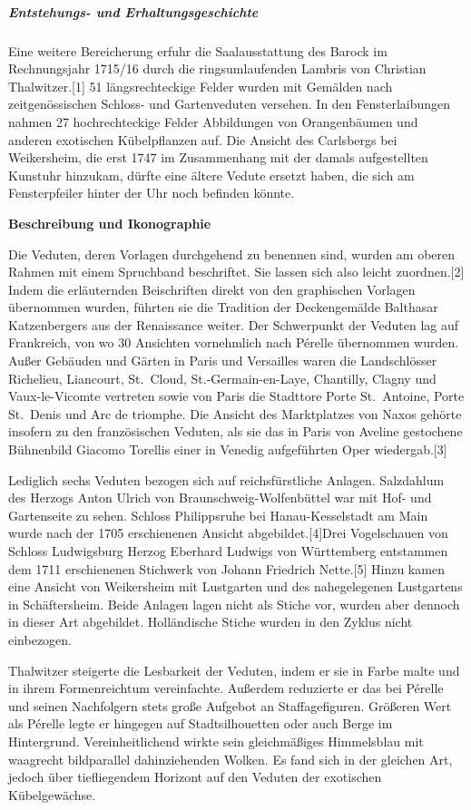\documentclass{book}
\begin{document}
\subparagraph{Entstehungs- und
Erhaltungsgeschichte}\label{entstehungs--und-erhaltungsgeschichte}

Eine weitere Bereicherung erfuhr die Saalausstattung des Barock im
Rechnungsjahr 1715/16 durch die ringsumlaufenden Lambris von Christian
Thalwitzer.{[}1{]} 51 längsrechteckige Felder wurden mit Gemälden nach
zeitgenössischen Schloss- und Gartenveduten versehen. In den
Fensterlaibungen nahmen 27 hochrechteckige Felder Abbildungen von
Orangenbäumen und anderen exotischen Kübelpflanzen auf. Die Ansicht des
Carlsbergs bei Weikersheim, die erst 1747 im Zusammenhang mit der damals
aufgestellten Kunstuhr hinzukam, dürfte eine ältere Vedute ersetzt
haben, die sich am Fensterpfeiler hinter der Uhr noch befinden könnte.

\textbf{Beschreibung und Ikonographie}

Die Veduten, deren Vorlagen durchgehend zu benennen sind, wurden am
oberen Rahmen mit einem Spruchband beschriftet. Sie lassen sich also
leicht zuordnen.{[}2{]} Indem die erläuternden Beischriften direkt von
den graphischen Vorlagen übernommen wurden, führten sie die Tradition
der Deckengemälde Balthasar Katzenbergers aus der Renaissance weiter.
Der Schwerpunkt der Veduten lag auf Frankreich, von wo 30 Ansichten
vornehmlich nach Pérelle übernommen wurden. Außer Gebäuden und Gärten in
Paris und Versailles waren die Landschlösser Richelieu, Liancourt,
St.~Cloud, St.-Germain-en-Laye, Chantilly, Clagny und Vaux-le-Vicomte
vertreten sowie von Paris die Stadttore Porte St.~Antoine, Porte
St.~Denis und Arc de triomphe. Die Ansicht des Marktplatzes von Naxos
gehörte insofern zu den französischen Veduten, als sie das in Paris von
Aveline gestochene Bühnenbild Giacomo Torellis einer in Venedig
aufgeführten Oper wiedergab.{[}3{]}

Lediglich sechs Veduten bezogen sich auf reichsfürstliche Anlagen.
Salzdahlum des Herzogs Anton Ulrich von Braunschweig-Wolfenbüttel war
mit Hof- und Gartenseite zu sehen. Schloss Philippsruhe bei
Hanau-Kesselstadt am Main wurde nach der 1705 erschienenen Ansicht
abgebildet.{[}4{]}Drei Vogelschauen von Schloss Ludwigsburg Herzog
Eberhard Ludwigs von Württemberg entstammen dem 1711 erschienenen
Stichwerk von Johann Friedrich Nette.{[}5{]} Hinzu kamen eine Ansicht
von Weikersheim mit Lustgarten und des nahegelegenen Lustgartens in
Schäftersheim. Beide Anlagen lagen nicht als Stiche vor, wurden aber
dennoch in dieser Art abgebildet. Holländische Stiche wurden in den
Zyklus nicht einbezogen.

Thalwitzer steigerte die Lesbarkeit der Veduten, indem er sie in Farbe
malte und in ihrem Formenreichtum vereinfachte. Außerdem reduzierte er
das bei Pérelle und seinen Nachfolgern stets große Aufgebot an
Staffagefiguren. Größeren Wert als Pérelle legte er hingegen auf
Stadtsilhouetten oder auch Berge im Hintergrund. Vereinheitlichend
wirkte sein gleichmäßiges Himmelsblau mit waagrecht bildparallel
dahinziehenden Wolken. Es fand sich in der gleichen Art, jedoch über
tiefliegendem Horizont auf den Veduten der exotischen Kübelgewächse.
\end{document}
